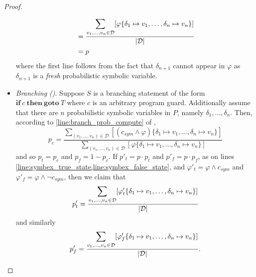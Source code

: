 \documentclass[acmsmall,review,anonymous]{acmart}\settopmatter{printfolios=true,printccs=false,printacmref=false}
\DeclarePairedDelimiter{\abs}{\lvert}{\rvert}
\begin{document}
\begin{proof}
\begin{itemize}
\begin{align*}
                                                                                                                         &= \frac{\displaystyle\sum_{v_1,\ldots,v_{n} \in \mathcal{D}} [ \varphi\{\delta_1 \mapsto v_1, \ldots, \delta_{n} \mapsto v_{n}\}]}{\abs{\mathcal{D}}} \\
                                                                                                                         &= p
    \end{align*}
    where the first line follows from the fact that $\delta_{n+1}$ cannot appear in $\varphi$ as $\delta_{n+1}$ is a \textit{fresh} probabilistic symbolic variable.
  \item \textit{Branching ()}. Suppose $S$ is a branching statement of the form $\mathbf{if}~c~\mathbf{then~goto}~T$ where $c$ is an arbitrary program guard.
    Additionally assume that there are $n$ probabilistic symbolic variables in $P$, namely $\delta_1,\ldots,\delta_n$.
    Then, according to \cref{line:branch_prob_compute} of ,
    \[
      p_c = \frac{\displaystyle\sum_{(v_1,\ldots,v_n) \in \mathcal{D}} [(c_{sym} \wedge \varphi)\{\delta_1 \mapsto v_1,\ldots,\delta_n \mapsto v_n\}]}{\displaystyle\sum_{(v_1,\ldots,v_n) \in \mathcal{D}}[\varphi\{\delta_1 \mapsto v_1,\ldots,\delta_n \mapsto v_n\}]}
    \]
    and so $p_t = p_c$ and $p_f = 1-p_c$.
    If $p'_t = p \cdot p_t$ and $p'_f = p \cdot p_f$, as on lines \cref{line:symbex_true_state,line:symbex_false_state}, and $\varphi'_t = \varphi \wedge c_{sym}$ and $\varphi'_f = \varphi \wedge \neg c_{sym}$, then we claim that
    \[
      p'_t = \frac{\displaystyle\sum_{v_1,\ldots,v_n \in \mathcal{D}} [ \varphi'_t\{\delta_1 \mapsto v_1, \ldots, \delta_n \mapsto v_n\} ]}{\abs{\mathcal{D}}}
    \]
    and similarly
    \[
      p'_f = \frac{\displaystyle\sum_{v_1,\ldots,v_n \in \mathcal{D}} [ \varphi'_f\{\delta_1 \mapsto v_1, \ldots, \delta_n \mapsto v_n\} ]}{\abs{\mathcal{D}}}.
    \]



\end{itemize}
\end{proof}
\end{document}
